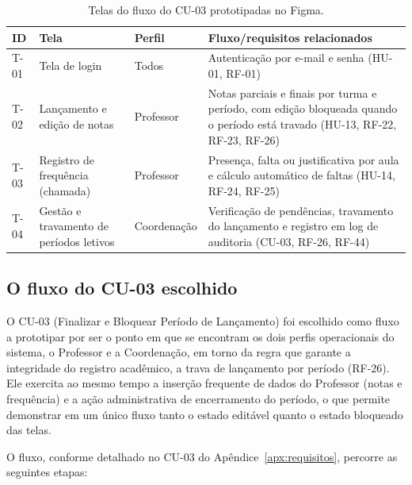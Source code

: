 \begin{table}[ht]
\centering
\caption{Telas do fluxo do CU-03 prototipadas no Figma.}\label{tab:telas-figma}
\begin{tabularx}{\textwidth}{p{} p{} p{} X}
\toprule
\textbf{ID} & \textbf{Tela} & \textbf{Perfil} & \textbf{Fluxo/requisitos relacionados} \\
\midrule
T-01 & Tela de login & Todos & Autenticação por e-mail e senha (HU-01, RF-01) \\
T-02 & Lançamento e edição de notas & Professor & Notas parciais e finais por turma e período, com edição bloqueada quando o período está travado (HU-13, RF-22, RF-23, RF-26) \\
T-03 & Registro de frequência (chamada) & Professor & Presença, falta ou justificativa por aula e cálculo automático de faltas (HU-14, RF-24, RF-25) \\
T-04 & Gestão e travamento de períodos letivos & Coordenação & Verificação de pendências, travamento do lançamento e registro em log de auditoria (CU-03, RF-26, RF-44) \\
\bottomrule
\end{tabularx}
\end{table}

\subsection{O fluxo do CU-03 escolhido}

O CU-03 (Finalizar e Bloquear Período de Lançamento) foi escolhido como fluxo a
prototipar por ser o ponto em que se encontram os dois perfis operacionais do
sistema, o Professor e a Coordenação, em torno da regra que garante a
integridade do registro acadêmico, a trava de lançamento por período (RF-26).
Ele exercita ao mesmo tempo a inserção frequente de dados do Professor (notas e
frequência) e a ação administrativa de encerramento do período, o que permite
demonstrar em um único fluxo tanto o estado editável quanto o estado bloqueado
das telas.

O fluxo, conforme detalhado no CU-03 do Apêndice~\ref{apx:requisitos}, percorre
as seguintes etapas:

